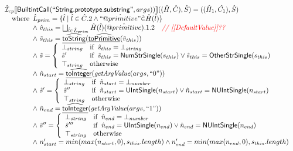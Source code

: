 \[
\begin{array}{l}

\hat{\mathcal{I}} _{cp}\llbracket \mbox{\textsf{BuiltintCall}}(``\mbox{\textsf{String.prototype.substring}}",args))\rrbracket((\hat{H},\hat{C}), \hat{S})
  = ((\hat{H}_1, \hat{C_1}), \hat{S})\\
\quad{\rm where}\begin{array}[t]{l} 
  \hat{L}_{prim} = \{ \hat{l} \mid \hat{l} \in \hat{C}.2 \land ``\hat{@primitive}" \dot{\in}\hat{H}(\hat{l}) \}\\
  \land\ \hat{v}_{this} = \bigsqcup_{\hat{l} \in \hat{L}_{prim}} \hat{H}(\hat{l})(\hat{@primitive}).1.2
    \quad\textit{{\color{red}// [[DefaultValue]]??}}\\
  \land\ \hat{s}_{this} = \widehat{\underline{\sf toString}}(\widehat{\underline{\sf toPrimitive}}(\hat{v}_{this}))\\
  \land\ \hat{s} = \left\{\begin{array}{ll}
      \bot_{string} & {\rm if}\begin{array}[t]{l}\hat{s}_{this} = \bot_{string}\end{array}\\
      \hat{s}' & {\rm if}\begin{array}[t]{l}\hat{s}_{this} = \mbox{\textsf{NumStrSingle}}(s_{this}) \lor \hat{s}_{this} = \mbox{\textsf{OtherStrSingle}}(s_{this}) \end{array}\\
      \top_{string} & {\rm otherwise}
    \end{array}\right.\\
  \land\ \hat{n}_{start} = \widehat{\underline{\sf toInteger}}(\emph{getArgValue}(args, ``0"))\\  
  \land\ \hat{s}' = \left\{\begin{array}{ll}
      \bot_{string} & {\rm if}\begin{array}[t]{l}\hat{n}_{start} = \bot_{number}\end{array}\\
      \hat{s}'' & {\rm if}\begin{array}[t]{l}\hat{n}_{start} = \mbox{\textsf{UIntSingle}}(n_{start}) \lor \hat{n}_{start} = \mbox{\textsf{NUIntSingle}}(n_{start}) \end{array}\\
      \top_{string} & {\rm otherwise}
    \end{array}\right.\\
  \land\ \hat{n}_{end} = \widehat{\underline{\sf toInteger}}(\emph{getArgValue}(args, ``1"))\\  
  \land\ \hat{s}'' = \left\{\begin{array}{ll}
      \bot_{string} & {\rm if}\begin{array}[t]{l}\hat{n}_{end} = \bot_{number}\end{array}\\
      \hat{s}''' & {\rm if}\begin{array}[t]{l}\hat{n}_{end} = \mbox{\textsf{UIntSingle}}(n_{end}) \lor \hat{n}_{end} = \mbox{\textsf{NUIntSingle}}(n_{end}) \end{array}\\
      \top_{string} & {\rm otherwise}
    \end{array}\right.\\
  \land\ n_{start}'= min(max(n_{start}, 0), s_{this}.length)
  \land n_{end}'= min(max(n_{end}, 0), s_{this}.length)\\
\end{array}
\end{array}\]
